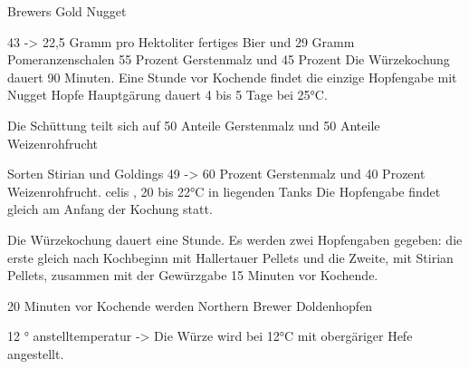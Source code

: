\documentclass[a4paper,parskip=half]{scrartcl}
\begin{document}



Brewers Gold
Nugget

43 -> 22,5 Gramm pro Hektoliter fertiges Bier und 29 Gramm Pomeranzenschalen
55 Prozent Gerstenmalz und 45 Prozent
Die Würzekochung dauert 90 Minuten. Eine Stunde vor
Kochende findet die einzige Hopfengabe mit Nugget Hopfe
Hauptgärung dauert 4 bis 5 Tage bei 25°C.


Die Schüttung teilt sich auf 50 Anteile Gerstenmalz und 50 Anteile Weizenrohfrucht

Sorten Stirian und Goldings
49 -> 60 Prozent Gerstenmalz und 40 Prozent Weizenrohfrucht.
celis , 20 bis 22°C in liegenden Tanks
Die Hopfengabe
findet gleich am Anfang der Kochung statt.

Die Würzekochung dauert eine Stunde. Es werden zwei Hopfengaben gegeben: die
erste gleich nach Kochbeginn mit Hallertauer Pellets und die Zweite, mit Stirian
Pellets, zusammen mit der Gewürzgabe 15 Minuten vor Kochende.

20 Minuten vor Kochende werden Northern
Brewer Doldenhopfen

12 ° anstelltemperatur -> Die Würze wird bei 12°C mit obergäriger Hefe angestellt.

\printbibliography[title=Quellen]
\end{document}
